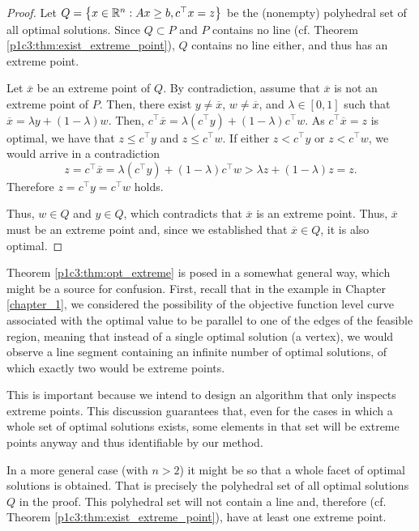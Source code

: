 \begin{proof}
	Let $Q = \left\{ x \in \mathbb{R}^n : Ax \geq b, c^\top x = z \right \}$ be the (nonempty) polyhedral set of all optimal solutions. Since $Q \subset P$ and $P$ contains no line (cf. Theorem \ref{p1c3:thm:exist_extreme_point}), $Q$ contains no line either, and thus has an extreme point.

	Let $\overline{x}$ be an extreme point of $Q$. By contradiction, assume that $\overline{x}$ is not an extreme point of $P$. Then, there exist $y \neq \overline{x}$, $w \neq \overline{x}$, and $\lambda \in [0,1]$ such that $\overline{x} = \lambda y + (1-\lambda)w$. Then, $c^\top \overline{x} = \lambda (c^\top y) + (1-\lambda)c^\top w$. As $c^\top \overline{x} = z$ is optimal, we have that $z \leq c^\top y$ and $z \leq c^\top w$. If either $z < c^\top y$ or $z < c^\top w$, we would arrive in a contradiction 
	$$
	z =  c^\top \overline{x} = \lambda (c^\top y) + (1-\lambda)c^\top w > \lambda z + (1-\lambda) z = z.
	$$
	Therefore $z = c^\top y = c^\top w$ holds. 
	
	Thus, $w \in Q$ and $y \in Q$, which contradicts that $\overline{x}$ is an extreme point. Thus, $\overline{x}$ must be an extreme point and, since we established that $\overline{x} \in Q$, it is also optimal. 
\end{proof}

Theorem \ref{p1c3:thm:opt_extreme} is posed in a somewhat general way, which might be a source for confusion. First, recall that in the example in Chapter \ref{chapter_1}, we considered the possibility of the objective function level curve associated with the optimal value to be parallel to one of the edges of the feasible region, meaning that instead of a single optimal solution (a vertex), we would observe a line segment containing an infinite number of optimal solutions, of which exactly two would be extreme points. 

This is important because we intend to design an algorithm that only inspects extreme points. This discussion guarantees that, even for the cases in which a whole set of optimal solutions exists, some elements in that set will be extreme points anyway and thus identifiable by our method.

In a more general case (with $n > 2$) it might be so that a whole facet of optimal solutions is obtained. That is precisely the polyhedral set of all optimal solutions $Q$ in the proof. This polyhedral set will not contain a line and, therefore (cf. Theorem \ref{p1c3:thm:exist_extreme_point}), have at least one extreme point. 

